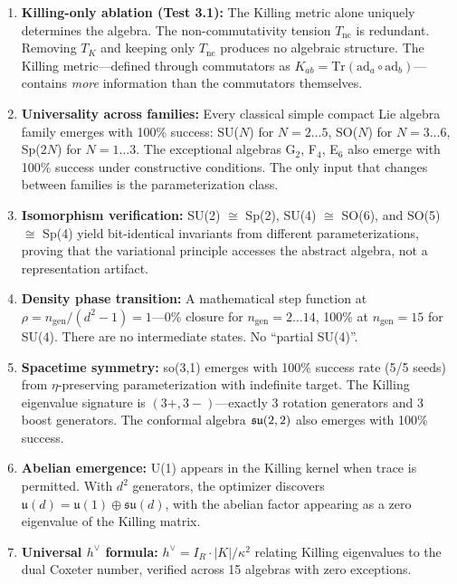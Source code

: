 \begin{enumerate}
\item \textbf{Killing-only ablation (Test 3.1):} The Killing metric alone uniquely determines the algebra. The non-commutativity tension $T_{\mathrm{nc}}$ is redundant. Removing $T_K$ and keeping only $T_{\mathrm{nc}}$ produces no algebraic structure. The Killing metric---defined through commutators as $K_{ab} = \mathrm{Tr}(\mathrm{ad}_a \circ \mathrm{ad}_b)$---contains \textit{more} information than the commutators themselves.

\item \textbf{Universality across families:} Every classical simple compact Lie algebra family emerges with 100\% success: SU($N$) for $N=2\ldots 5$, SO($N$) for $N=3\ldots 6$, Sp($2N$) for $N=1\ldots 3$. The exceptional algebras G$_2$, F$_4$, E$_6$ also emerge with 100\% success under constructive conditions. The only input that changes between families is the parameterization class.

\item \textbf{Isomorphism verification:} SU(2) $\cong$ Sp(2), SU(4) $\cong$ SO(6), and SO(5) $\cong$ Sp(4) yield bit-identical invariants from different parameterizations, proving that the variational principle accesses the abstract algebra, not a representation artifact.

\item \textbf{Density phase transition:} A mathematical step function at $\rho = n_{\mathrm{gen}}/(d^2-1) = 1$---0\% closure for $n_{\mathrm{gen}} = 2\ldots 14$, 100\% at $n_{\mathrm{gen}} = 15$ for SU(4). There are no intermediate states. No ``partial SU(4)''.

\item \textbf{Spacetime symmetry:} so(3,1) emerges with 100\% success rate (5/5 seeds) from $\eta$-preserving parameterization with indefinite target. The Killing eigenvalue signature is $(3+,3-)$---exactly 3 rotation generators and 3 boost generators. The conformal algebra $\mathfrak{su}(2,2)$ also emerges with 100\% success.

\item \textbf{Abelian emergence:} U(1) appears in the Killing kernel when trace is permitted. With $d^2$ generators, the optimizer discovers $\mathfrak{u}(d) = \mathfrak{u}(1) \oplus \mathfrak{su}(d)$, with the abelian factor appearing as a zero eigenvalue of the Killing matrix.

\item \textbf{Universal $h^\vee$ formula:} $h^\vee = I_R \cdot |K|/\kappa^2$ relating Killing eigenvalues to the dual Coxeter number, verified across 15 algebras with zero exceptions.


\end{enumerate}
